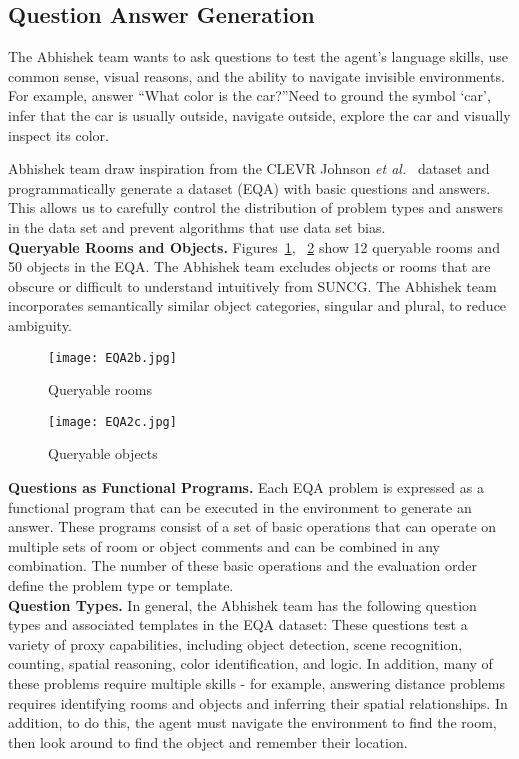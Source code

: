 \documentclass[10pt,twocolumn,letterpaper]{article}
\begin{document}
       \subsection{Question Answer Generation}
       The Abhishek team wants to ask questions to test the agent's language skills, use common sense, visual reasons, and the ability to navigate invisible environments. For example, answer ``What color is the car?''Need to ground the symbol `car', infer that the car is usually outside, navigate outside, explore the car and visually inspect its color.
       \par
       Abhishek team draw inspiration from the CLEVR Johnson \emph{et al.}~\cite{[39]} dataset and programmatically generate a dataset (EQA) with basic questions and answers. This allows us to carefully control the distribution of problem types and answers in the data set and prevent algorithms that use data set bias. \\
       \textbf{Queryable Rooms and Objects.} Figures~\ref{fig2b}, ~\ref{fig2c} show 12 queryable rooms and 50 objects in the EQA. The Abhishek team excludes objects or rooms that are obscure or difficult to understand intuitively from SUNCG. The Abhishek team incorporates semantically similar object categories, singular and plural, to reduce ambiguity. \\
       \begin{figure}[htbp]
            \centering
            \texttt{[image: EQA2b.jpg]}
            \caption{Queryable rooms}
            \label{fig2b}
       \end{figure}
       \begin{figure}[htbp]
            \centering
            \texttt{[image: EQA2c.jpg]}
            \caption{Queryable objects}
            \label{fig2c}
       \end{figure}
       \textbf{Questions as Functional Programs.} Each EQA problem is expressed as a functional program that can be executed in the environment to generate an answer. These programs consist of a set of basic operations that can operate on multiple sets of room or object comments and can be combined in any combination. The number of these basic operations and the evaluation order define the problem type or template. \\
       \textbf{Question Types.} In general, the Abhishek team has the following question types and associated templates in the EQA dataset: These questions test a variety of proxy capabilities, including object detection, scene recognition, counting, spatial reasoning, color identification, and logic. In addition, many of these problems require multiple skills - for example, answering distance problems requires identifying rooms and objects and inferring their spatial relationships. In addition, to do this, the agent must navigate the environment to find the room, then look around to find the object and remember their location. \\
\end{document}
